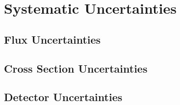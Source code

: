 \documentclass[../main.tex]{subfiles}
\begin{document}
\section{Systematic Uncertainties}
\label{sec:systs}

\subsection{Flux Uncertainties}
\subsection{Cross Section Uncertainties}
\subsection{Detector Uncertainties}
\end{document}
